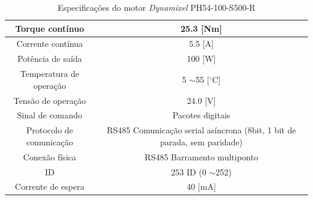 \documentclass[
12pt,					%
openright,				%
twoside,				%
a4paper,				%
english,
brazil
]{ABNT/abntex2_report}
\begin{document}
\begin{table}[H]
\begin{adjustbox}{max width=\textwidth}
\begin{tabular}{|c|c|}
			\rowcolor[HTML]{FFFFFF} 
			{\color[HTML]{000000} Torque contínuo}                                             & {\color[HTML]{000000} 25.3 {[}Nm{]}}                                                            \\ \hline
			\rowcolor[HTML]{EFEFEF} 
			{\color[HTML]{000000} Corrente contínua}                                           & {\color[HTML]{000000} 5.5 {[}A{]}}                                                              \\ \hline
			\rowcolor[HTML]{FFFFFF} 
			{\color[HTML]{000000} Potência de saída}                                           & {\color[HTML]{000000} 100 {[}W{]}}                                                              \\ \hline
			\rowcolor[HTML]{EFEFEF} 
			{\color[HTML]{000000} Temperatura de operação}                                     & {\color[HTML]{000000} 5 $\sim$55 {[}$^\circ$C{]}}                                               \\ \hline
			\rowcolor[HTML]{FFFFFF} 
			{\color[HTML]{000000} Tensão de operação}                                          & {\color[HTML]{000000} 24.0 {[}V{]}}                                                             \\ \hline
			\rowcolor[HTML]{EFEFEF} 
			{\color[HTML]{000000} Sinal de comando}                                            & {\color[HTML]{000000} Pacotes digitais}                                                         \\ \hline
			\rowcolor[HTML]{FFFFFF} 
			{\color[HTML]{000000} Protocolo de comunicação}                                    & {\color[HTML]{000000} RS485 Comunicação serial asíncrona (8bit, 1 bit de parada, sem paridade)} \\ \hline
			\rowcolor[HTML]{EFEFEF} 
			{\color[HTML]{000000} Conexão física}                                              & {\color[HTML]{000000} RS485 Barramento multiponto}                                              \\ \hline
			\rowcolor[HTML]{FFFFFF} 
			{\color[HTML]{000000} ID}                                                          & {\color[HTML]{000000} 253 ID (0 $\sim$252)}                                                     \\ \hline
			\rowcolor[HTML]{EFEFEF} 
			{\color[HTML]{000000} Corrente de espera}                                          & {\color[HTML]{000000} 40 {[}mA{]}}                                                              \\ \hline
			\end{tabular}
			\end{adjustbox}
			\caption{Especificações do motor \textit{Dynamixel} PH54-100-S500-R}
			\end{table}
\end{document}
